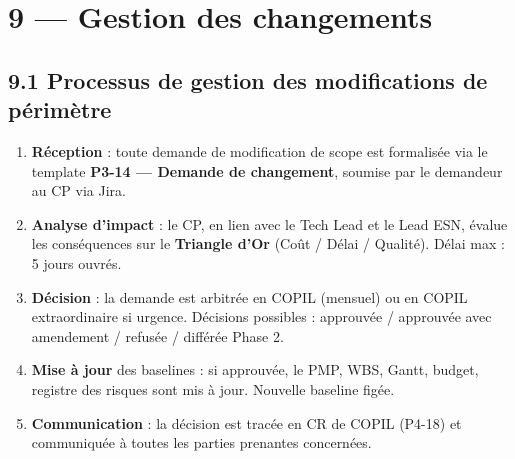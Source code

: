 \documentclass[11pt,a4paper,oneside]{report}
\begin{document}
\newpage
\section*{9 --- Gestion des changements}

\subsection*{9.1 Processus de gestion des modifications de périmètre}
\vspace{4pt}
\begin{center}
\end{center}

\begin{enumerate}
  \item \textbf{Réception} : toute demande de modification de scope est formalisée via le template \textbf{P3-14 --- Demande de changement}, soumise par le demandeur au CP via Jira.
  \item \textbf{Analyse d'impact} : le CP, en lien avec le Tech Lead et le Lead ESN, évalue les conséquences sur le \textbf{Triangle d'Or} (Coût / Délai / Qualité). Délai max : 5 jours ouvrés.
  \item \textbf{Décision} : la demande est arbitrée en COPIL (mensuel) ou en COPIL extraordinaire si urgence. Décisions possibles : approuvée / approuvée avec amendement / refusée / différée Phase 2.
  \item \textbf{Mise à jour} des baselines : si approuvée, le PMP, WBS, Gantt, budget, registre des risques sont mis à jour. Nouvelle baseline figée.
  \item \textbf{Communication} : la décision est tracée en CR de COPIL (P4-18) et communiquée à toutes les parties prenantes concernées.
\end{enumerate}
\end{document}
